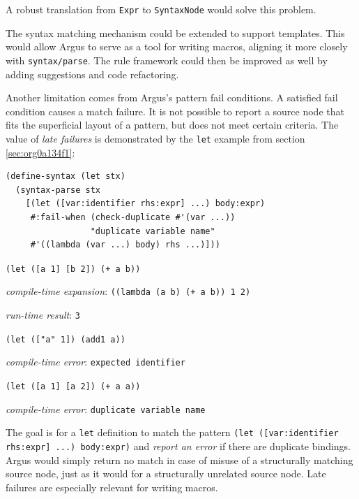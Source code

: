 \documentclass{juliacon}
\begin{document}
A robust translation from \texttt{Expr} to \texttt{SyntaxNode} would solve this
problem.

The syntax matching mechanism could be extended to support
templates. This would allow Argus to serve as a tool for writing
macros, aligning it more closely with \texttt{syntax/parse}. The rule
framework could then be improved as well by adding suggestions and
code refactoring.

Another limitation comes from Argus's pattern fail conditions. A
satisfied fail condition causes a match failure. It is not possible to
report a source node that fits the superficial layout of a pattern,
but does not meet certain criteria. The value of \emph{late failures} is
demonstrated by the \texttt{let} example from section \ref{sec:org0a134f1}:

\begin{lstlisting}[language=racket]
(define-syntax (let stx)
  (syntax-parse stx
    [(let ([var:identifier rhs:expr] ...) body:expr)
     #:fail-when (check-duplicate #'(var ...))
                 "duplicate variable name"
     #'((lambda (var ...) body) rhs ...)]))
\end{lstlisting}

\texttt{(let ([a 1] [b 2]) (+ a b))}

\hspace{0.3cm}\textit{compile-time expansion}: \texttt{((lambda (a b) (+ a b)) 1 2)}

\hspace{0.3cm}\textit{run-time result}: \texttt{3}

\vspace{0.25cm}

\texttt{(let (["a" 1]) (add1 a))}

\hspace{0.3cm}\textit{compile-time error}: \texttt{expected identifier}

\vspace{0.25cm}

\texttt{(let ([a 1] [a 2]) (+ a a))}

\hspace{0.3cm}\textit{compile-time error}: \texttt{duplicate variable name}

\vspace{1em}

The goal is for a \texttt{let} definition to match the pattern \texttt{(let
([var:identifier} \texttt{rhs:expr] ...) body:expr)} and \emph{report an error} if
there are duplicate bindings. Argus would simply return no match in
case of misuse of a structurally matching source node, just as it
would for a structurally unrelated source node. Late failures are
especially relevant for writing macros.
\end{document}
